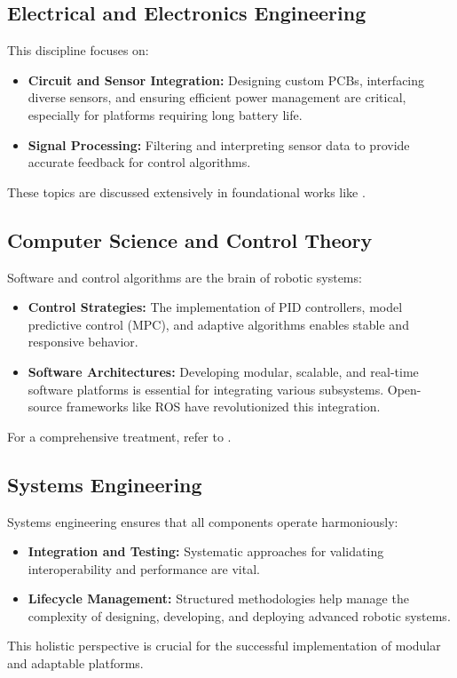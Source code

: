 \subsection{Electrical and Electronics Engineering}
This discipline focuses on:
\begin{itemize}
    \item \textbf{Circuit and Sensor Integration:} Designing custom PCBs, interfacing diverse sensors, and ensuring efficient power management are critical, especially for platforms requiring long battery life.
    \item \textbf{Signal Processing:} Filtering and interpreting sensor data to provide accurate feedback for control algorithms.
\end{itemize}
These topics are discussed extensively in foundational works like \cite{Craig2005}.

\subsection{Computer Science and Control Theory}
Software and control algorithms are the brain of robotic systems:
\begin{itemize}
    \item \textbf{Control Strategies:} The implementation of PID controllers, model predictive control (MPC), and adaptive algorithms enables stable and responsive behavior.
    \item \textbf{Software Architectures:} Developing modular, scalable, and real-time software platforms is essential for integrating various subsystems. Open-source frameworks like ROS have revolutionized this integration.
\end{itemize}
For a comprehensive treatment, refer to \cite{Siciliano2009}.

\subsection{Systems Engineering}
Systems engineering ensures that all components operate harmoniously:
\begin{itemize}
    \item \textbf{Integration and Testing:} Systematic approaches for validating interoperability and performance are vital.
    \item \textbf{Lifecycle Management:} Structured methodologies help manage the complexity of designing, developing, and deploying advanced robotic systems.
\end{itemize}
This holistic perspective is crucial for the successful implementation of modular and adaptable platforms.

